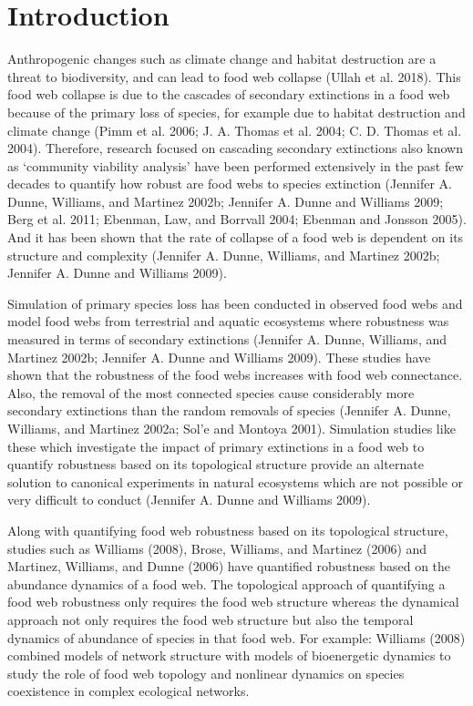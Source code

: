 \documentclass{article}
\begin{document}

\hypertarget{introduction}{%
\section{Introduction}\label{introduction}}

Anthropogenic changes such as climate change and habitat destruction are
a threat to biodiversity, and can lead to food web collapse (Ullah et
al. 2018). This food web collapse is due to the cascades of secondary
extinctions in a food web because of the primary loss of species, for
example due to habitat destruction and climate change (Pimm et al. 2006;
J. A. Thomas et al. 2004; C. D. Thomas et al. 2004). Therefore, research
focused on cascading secondary extinctions also known as `community
viability analysis' have been performed extensively in the past few
decades to quantify how robust are food webs to species extinction
(Jennifer A. Dunne, Williams, and Martinez 2002b; Jennifer A. Dunne and
Williams 2009; Berg et al. 2011; Ebenman, Law, and Borrvall 2004;
Ebenman and Jonsson 2005). And it has been shown that the rate of
collapse of a food web is dependent on its structure and complexity
(Jennifer A. Dunne, Williams, and Martinez 2002b; Jennifer A. Dunne and
Williams 2009).

Simulation of primary species loss has been conducted in observed food
webs and model food webs from terrestrial and aquatic ecosystems where
robustness was measured in terms of secondary extinctions (Jennifer A.
Dunne, Williams, and Martinez 2002b; Jennifer A. Dunne and Williams
2009). These studies have shown that the robustness of the food webs
increases with food web connectance. Also, the removal of the most
connected species cause considerably more secondary extinctions than the
random removals of species (Jennifer A. Dunne, Williams, and Martinez
2002a; Sol'e and Montoya 2001). Simulation studies like these which
investigate the impact of primary extinctions in a food web to quantify
robustness based on its topological structure provide an alternate
solution to canonical experiments in natural ecosystems which are not
possible or very difficult to conduct (Jennifer A. Dunne and Williams
2009).

Along with quantifying food web robustness based on its topological
structure, studies such as Williams (2008), Brose, Williams, and
Martinez (2006) and Martinez, Williams, and Dunne (2006) have quantified
robustness based on the abundance dynamics of a food web. The
topological approach of quantifying a food web robustness only requires
the food web structure whereas the dynamical approach not only requires
the food web structure but also the temporal dynamics of abundance of
species in that food web. For example: Williams (2008) combined models
of network structure with models of bioenergetic dynamics to study the
role of food web topology and nonlinear dynamics on species coexistence
in complex ecological networks.
\end{document}

